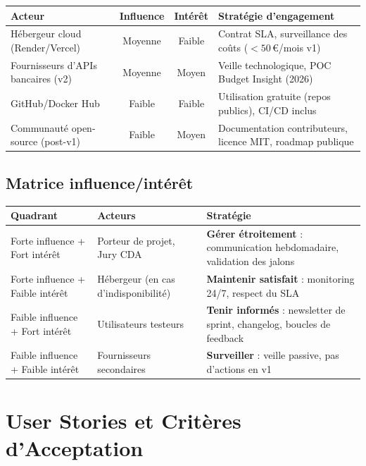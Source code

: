 \begin{center}
\small
\begin{tabular}{|p{3.5cm}|c|c|p{6cm}|}
\hline
\textbf{Acteur} & \textbf{Influence} & \textbf{Intérêt} & \textbf{Stratégie d'engagement} \\
\hline
Hébergeur cloud (Render/Vercel) & Moyenne & Faible & Contrat SLA, surveillance des coûts ($< 50$\,€/mois v1) \\
\hline
Fournisseurs d'APIs bancaires (v2) & Moyenne & Moyen & Veille technologique, POC Budget Insight (2026) \\
\hline
GitHub/Docker Hub & Faible & Faible & Utilisation gratuite (repos publics), CI/CD inclus \\
\hline
Communauté open-source (post-v1) & Faible & Moyen & Documentation contributeurs, licence MIT, roadmap publique \\
\hline
\end{tabular}
\end{center}

\subsection{Matrice influence/intérêt}

\begin{center}
\begin{tabular}{|p{4.5cm}|p{4cm}|p{5cm}|}
\hline
\textbf{Quadrant} & \textbf{Acteurs} & \textbf{Stratégie} \\
\hline
Forte influence + Fort intérêt & Porteur de projet, Jury CDA & \textbf{Gérer étroitement} : communication hebdomadaire, validation des jalons \\
\hline
Forte influence + Faible intérêt & Hébergeur (en cas d'indisponibilité) & \textbf{Maintenir satisfait} : monitoring 24/7, respect du SLA \\
\hline
Faible influence + Fort intérêt & Utilisateurs testeurs & \textbf{Tenir informés} : newsletter de sprint, changelog, boucles de feedback \\
\hline
Faible influence + Faible intérêt & Fournisseurs secondaires & \textbf{Surveiller} : veille passive, pas d'actions en v1 \\
\hline
\end{tabular}
\end{center}

\section{User Stories et Critères d'Acceptation}

